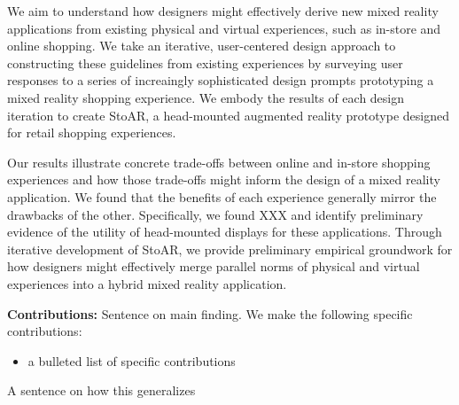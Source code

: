 

We aim to understand how designers might effectively derive new mixed reality applications from existing physical and virtual experiences, such as in-store and online shopping. 
We take an iterative, user-centered design approach to constructing these guidelines from existing experiences by surveying user responses to a series of increaingly sophisticated design prompts prototyping a mixed reality shopping experience.   We embody the results of each design iteration to create StoAR, a head-mounted augmented reality prototype designed for retail shopping experiences.

Our results illustrate concrete trade-offs between online and in-store shopping experiences and how those trade-offs might inform the design of a mixed reality application. We found that the benefits of each experience generally mirror the drawbacks of the other.  Specifically, we found XXX and identify preliminary evidence of the utility of head-mounted displays for these applications. Through iterative development of StoAR, we provide preliminary empirical groundwork for how designers might effectively merge parallel norms of physical and virtual experiences into a hybrid mixed reality application. 

\noindent\textbf{Contributions:} Sentence on main finding. We make the following specific contributions:
\begin{itemize}
	\item a bulleted list of specific contributions
\end{itemize}
A sentence on how this generalizes


